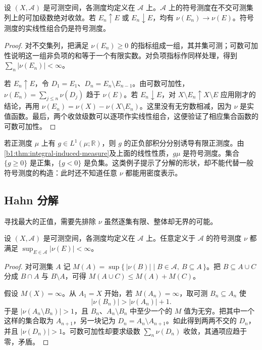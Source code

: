 \begin{proposition}\label{b1:prop:signed-measure-basic}
设 \((X,\mathcal A)\) 是可测空间，各测度均定义在 \(\mathcal A\) 上。\(\mathcal A\) 上的符号测度在不交可测集列上的可加级数绝对收敛。若 \(E_n\uparrow E\) 或 \(E_n\downarrow E\)，均有 \(\nu(E_n)\rightarrow\nu(E)\)。符号测度的实线性组合仍是符号测度。
\end{proposition}
\begin{proof}
对不交集列，把满足 \(\nu(E_n)\geq0\) 的指标组成一组，其并集可测；可数可加性说明这一组非负项的和等于一个有限实数。对负项指标作同样处理，得到 \(\sum_n|\nu(E_n)|<\infty\)。

若 \(E_n\uparrow E\)，令 \(D_1=E_1\)、\(D_n=E_n\setminus E_{n-1}\)。由可数可加性，\(\nu(E_n)=\sum_{j\leq n}\nu(D_j)\) 趋于 \(\nu(E)\)。若 \(E_n\downarrow E\)，对 \(X\setminus E_n\uparrow X\setminus E\) 应用刚才的结论，再用 \(\nu(E_n)=\nu(X)-\nu(X\setminus E_n)\)。这里没有无穷数相减，因为 \(\nu\) 是实值函数。最后，两个收敛级数可以逐项作实线性组合，这便验证了相应集合函数的可数可加性。
\end{proof}

若正测度 \(\mu\) 上有 \(g\in L^1(\mu;\mathbb R)\)，则 \(g\) 的正负部积分分别诱导有限正测度。由\cref{b1:thm:integral-induced-measure}及上面的线性性质，\(g\mu\) 是符号测度。集合 \(\{g\geq0\}\) 是正集，\(\{g<0\}\) 是负集。这类例子提示了分解的形状，却不能代替一般符号测度的构造：此时还不知道任意 \(\nu\) 都能用密度表示。

\subsection{Hahn 分解}
\label{b1:subsec:060102}

寻找最大的正值，需要先排除 \(\nu\) 虽然逐集有限、整体却无界的可能。

\begin{lemma}\label{b1:lem:signed-measure-bounded}
设 \((X,\mathcal A)\) 是可测空间，各测度均定义在 \(\mathcal A\) 上。任意定义于 \(\mathcal A\) 的符号测度 \(\nu\) 都满足 \(\sup_{E\in\mathcal A}|\nu(E)|<\infty\)。
\end{lemma}
\begin{proof}
对可测集 \(A\) 记 \(M(A)=\sup\{\,|\nu(B)|\mid B\in\mathcal A,\ B\subseteq A\,\}\)。把 \(B\subseteq A\cup C\) 分成 \(B\cap A\) 与 \(B\setminus A\)，可得 \(M(A\cup C)\leq M(A)+M(C)\)。

假设 \(M(X)=\infty\)。从 \(A_1=X\) 开始，若 \(M(A_n)=\infty\)，取可测 \(B_n\subseteq A_n\) 使
\[
|\nu(B_n)|>|\nu(A_n)|+1.
\]
于是 \(|\nu(A_n\setminus B_n)|>1\)，且 \(B_n\)、\(A_n\setminus B_n\) 中至少一个的 \(M\) 值为无穷。把其中一个这样的集合取为 \(A_{n+1}\)，另一块记为 \(D_n=A_n\setminus A_{n+1}\)。如此得到两两不交的 \(D_n\)，并且 \(|\nu(D_n)|>1\)。可数可加性却要求级数 \(\sum_n\nu(D_n)\) 收敛，其通项应趋于零，矛盾。
\end{proof}

